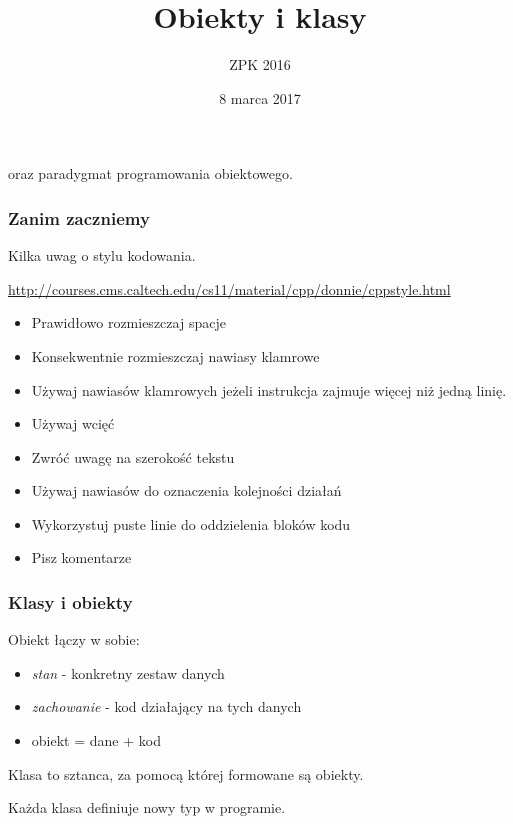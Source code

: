 \documentclass[pdftex, smaller]{beamer}
\author{ZPK 2016}
\title[Obiekty i klasy]
{Obiekty i klasy}
\date{8 marca 2017}
\begin{document}
\begin{frame}
  \titlepage

  \begin{center}
    oraz paradygmat programowania obiektowego.
  \end{center}
\end{frame}

\begin{frame}
\frametitle{Zanim zaczniemy}

Kilka uwag o stylu kodowania.

\vspace{2mm}
\url{http://courses.cms.caltech.edu/cs11/material/cpp/donnie/cppstyle.html}

\vspace{2mm}
\begin{itemize}
\item Prawidłowo rozmieszczaj spacje
\item Konsekwentnie rozmieszczaj nawiasy klamrowe
\item Używaj nawiasów klamrowych jeżeli instrukcja zajmuje więcej niż jedną linię.
\item Używaj wcięć
\item Zwróć uwagę na szerokość tekstu
\item Używaj nawiasów do oznaczenia kolejności działań
\item Wykorzystuj puste linie do oddzielenia bloków kodu
\item Pisz komentarze
\end{itemize}

\end{frame}

\begin{frame}
\frametitle{Klasy i obiekty}

Obiekt łączy w sobie:

\begin{itemize}
  \item \emph{stan} - konkretny zestaw danych
  \item \emph{zachowanie} - kod działający na tych danych
  \item obiekt = dane + kod
\end{itemize}

\vspace{8mm}
Klasa to sztanca, za pomocą której formowane są obiekty.

\vspace{8mm}
Każda klasa definiuje nowy typ w programie.
\end{frame}
\end{document}
